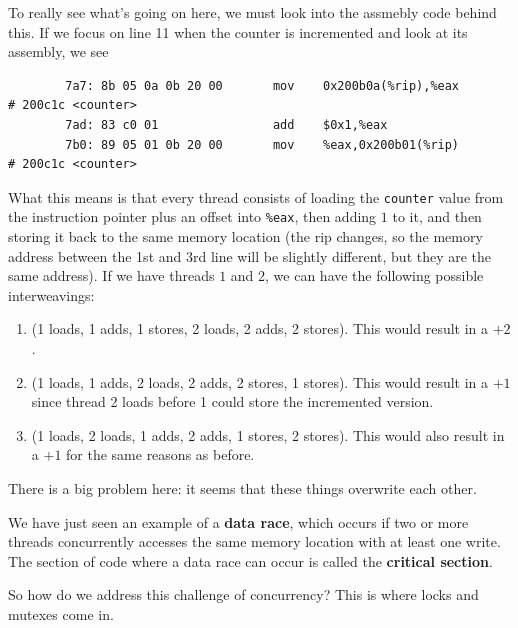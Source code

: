 \documentclass{article}
\begin{document}
\begin{example}
      To really see what's going on here, we must look into the assmebly code behind this. If we focus on line 11 when the counter is incremented and look at its assembly, we see 
      \begin{lstlisting}
        7a7: 8b 05 0a 0b 20 00       mov    0x200b0a(%rip),%eax        # 200c1c <counter> 
        7ad: 83 c0 01                add    $0x1,%eax 
        7b0: 89 05 01 0b 20 00       mov    %eax,0x200b01(%rip)        # 200c1c <counter> 
      \end{lstlisting}
      What this means is that every thread consists of loading the \texttt{counter} value from the instruction pointer plus an offset into \texttt{\%eax}, then adding $1$ to it, and then storing it back to the same memory location (the rip changes, so the memory address between the 1st and 3rd line will be slightly different, but they are the same address). If we have threads $1$ and $2$, we can have the following possible interweavings: 
      \begin{enumerate}
        \item (1 loads, 1 adds, 1 stores, 2 loads, 2 adds, 2 stores). This would result in a $+2$. 
        \item (1 loads, 1 adds, 2 loads, 2 adds, 2 stores, 1 stores). This would result in a $+1$ since thread 2 loads before 1 could store the incremented version. 
        \item (1 loads, 2 loads, 1 adds, 2 adds, 1 stores, 2 stores). This would also result in a $+1$ for the same reasons as before. 
      \end{enumerate}
    \end{example}


    There is a big problem here: it seems that these things overwrite each other. 

    \begin{definition}
      We have just seen an example of a \textbf{data race}, which occurs if two or more threads concurrently accesses the same memory location with at least one write. The section of code where a data race can occur is called the \textbf{critical section}. 
    \end{definition}

    So how do we address this challenge of concurrency? This is where locks and mutexes come in. 
\end{document}
